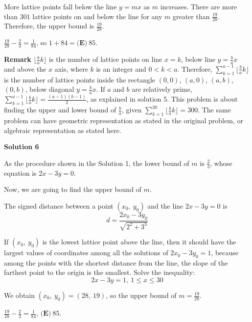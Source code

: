 \begin{enumerate}
 More lattice points fall below the line $y = mx$ as $m$ increases. There are more than $301$ lattice points on and below the line for any $m$ greater than $\frac{19}{28}$. Therefore, the upper bound is $\frac{19}{28}$.

 $\frac{19}{28}-\frac{2}{3}=\frac{1}{84}$, so $1+84=\boxed{\textbf{(E)} ~85}$.

 \textbf{Remark} $\lfloor \frac{b}{a} k \rfloor$ is the number of lattice points on line $x = k$, below line $y = \frac{b}{a} x$ and above the $x$ axis, where $k$ is an integer and $0<k<a$. Therefore, $\sum_{k=1}^{a-1} \lfloor \frac{b}{a} k \rfloor$ is the number of lattice points inside the rectangle $(0,0)$, $(a,0)$, $(a, b)$, $(0, b)$, below diagonal $y = \frac{b}{a} x$. If $a$ and $b$ are relatively prime, $\sum_{k=1}^{a-1} \lfloor \frac{b}{a} k \rfloor = \frac{(a-1)(b-1)}{2}$, as explained in solution 5. This problem is about finding the upper and lower bound of $\frac{b}{a}$, given $\sum_{k=1}^{30} \lfloor \frac{b}{a} k \rfloor = 300$. The same problem can have geometric representation as stated in the original problem, or algebraic representation as stated here.

 



\textbf{Solution 6}

As the procedure shown in the Solution 1, the lower bound of $m$ is $\frac{2}{3}$, whose equation is $2x - 3y = 0$.

 Now, we are going to find the upper bound of $m$.

 The signed distance between a point $(x_0,\ y_0)$ and the line $2x - 3y = 0$ is 
 \[d = \frac{2x_0 - 3y_0}{\sqrt{2^2 + 3^3}}\]

 If $(x_0,\ y_0)$ is the lowest lattice point above the line, then it should have the largest values of coordinates among all the solutions of $2x_0 - 3y_0 = 1$, because among the points with the shortest distance from the line, the slope of the farthest point to the origin is the smallest. Solve the inequality:
 \[2x - 3y = 1,\ 1 \leq x \leq 30\]

 We obtain $(x_0,\ y_0) = (28,\ 19)$, so the upper bound of $m = \frac{19}{28}$.

 $\frac{19}{28}-\frac{2}{3}=\frac{1}{84}$, $\boxed{\textbf{(E)} ~85}$.

 


\end{enumerate}